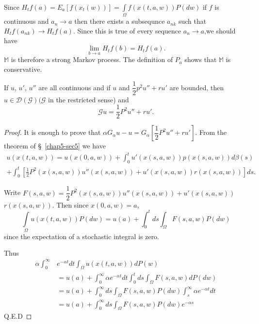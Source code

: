 Since $H_t f(a) = E_a [f(x_t (w))] = \int\limits_{\Omega} f (x(t, a,
w)) P(dw)$ if $f$ is continuous and $a_n \rightarrow a$ then there
exists a subsequnce $a_{nk}$ such that $H_t f(a_{nk}) \rightarrow H_t
f(a)$. Since this is true of every sequence $a_n \rightarrow a$,we
should have 
$$
\lim\limits_{b \rightarrow a} H_t f(b) = H_t f(a).
$$
$\mathbb{M}$ is therefore a strong Markov process. The definition of
$P_a$ shows that $\mathbb{M}$ is conservative. 

\setcounter{thm}{0}
\begin{thm}\label{chap5-sec7-thm1}%
If $u$, $u'$, $u''$ are all continuous and if $u$ and $\dfrac{1}{2}p^{2}u'' +
  ru'$ are bounded, then $u \in \mathscr{D} (\mathscr{G})
  (\mathscr{G}$ in the restricted sense) and  
  $$
  \mathscr{G} u = \frac{1}{2} P^2 u'' + ru'.
  $$
\end{thm}

\begin{proof}
  It is enough to prove that $\alpha G_\alpha u - u = G_\alpha
  [\dfrac{1}{2} P^2 u'' + ru']$. From the theorem of
  \S\ \ref{chap5-sec5} we have   
  \begin{multline*}
  u(x(t, a, w)) = u (x(0, a, w)) + \int^t_0 u' (x(s, a, w)) p(x(s, a,
  w))d \beta (s)\\ 
  + \int^t_0 \left[\frac{1}{2} P^2 (x(s, a, w)) u'' (x(s,
    a, w)) + u' (x(s, a, w)) r(x(s, a, w))\right] ds.
  \end{multline*}

Write $F(s, a, w) = \dfrac{1}{2} P^2 (x(s, a, w)) u'' (x(s, a, w)) +
u' (x(s, a, w))$ \break $r(x(s, a, w))$. Then\pageoriginale 
since $x(0, a, w) = a$, 
\begin{equation}
  \int\limits_{\Omega} u(x(t, a, w)) P(dw) = u(a) + \int^t_0 ds
  \int_\Omega F(s, a, w) P(dw) \tag{1}\label{chap5-sec7-eq1} 
\end{equation}
since the expectation of a stochastic integral is zero.

Thus 
\begin{align*}
  \alpha \int^\infty_0&  e^{- \alpha t} dt \int_\Omega u(x(t, a, w)) dP
  (w)\\ 
  & = u (a) + \int^\infty_0 \alpha e^{- \alpha t} dt \int^t_0 ds
  \int_\Omega F(s, a, w) dP (dw) \\
  &= u(a) + \int^\infty_0 ds \int_\Omega F (s, a, w) P (dw)
  \int^\infty_s \alpha e^{- \alpha t}dt\\ 
  &= u (a) + \int^\infty_0 ds \int_\Omega F(s, a, w) P (dw) e^{-\alpha s}
\end{align*}
Q.E.D
\end{proof}

